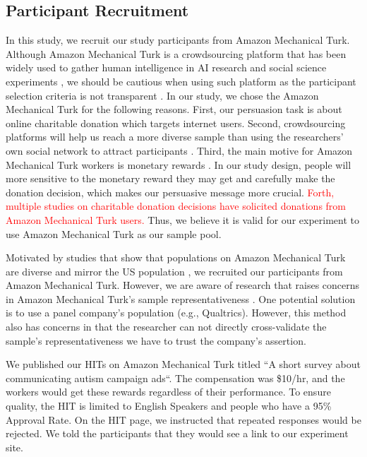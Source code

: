 \subsection{Participant Recruitment}
\label{sub:Participant Recruitment}
In this study, we recruit our study participants from Amazon Mechanical Turk. Although Amazon Mechanical Turk is a crowdsourcing platform that has been widely used to gather human intelligence in AI research and social science experiments \cite{ paolacci2014inside,berinsky2012evaluating,buhrmester2011amazon,branas2018gender,lee2013does,saunders2016no,arechar2017turking,sussman2015framing}, we should be cautious when using such platform as the participant selection criteria is not transparent \cite{landers2015inconvenient,paolacci2010running}. In our study, we chose the Amazon Mechanical Turk for the following reasons. First, our persuasion task is about online charitable donation which targets internet users. Second, crowdsourcing platforms will help us reach a more diverse sample than using the researchers' own social network to attract participants \cite{buhrmester2011amazon}. Third, the main motive for Amazon Mechanical Turk workers is monetary rewards \cite{berinsky2012evaluating}. In our study design, people will more sensitive to the monetary reward they may get and carefully make the donation decision, which makes our persuasive message more crucial. \textcolor{red}{Forth, multiple studies on charitable donation decisions have solicited donations from Amazon Mechanical Turk users\cite{branas2018gender,lee2013does,saunders2016no,arechar2017turking,sussman2015framing}.} Thus, we believe it is valid for our experiment to use Amazon Mechanical Turk as our sample pool. 

Motivated by studies that show that populations on Amazon Mechanical Turk are diverse and mirror the US population \cite{buhrmester2011amazon,behrend2011viability,berinsky2012evaluating}, we recruited our participants from Amazon Mechanical Turk. However, we are aware of research that raises concerns in Amazon Mechanical Turk's sample representativeness \cite{landers2015inconvenient,paolacci2010running}. One potential solution is to use a panel company's population (e.g., Qualtrics). However, this method also has concerns in that the researcher can not directly cross-validate the sample's representativeness we have to trust the company's assertion. 

We published our HITs on Amazon Mechanical Turk titled ``A short survey about communicating autism campaign ads``. The compensation was \$10/hr, and the workers would get these rewards regardless of their performance. To ensure quality, the HIT is limited to English Speakers and people who have a 95\% Approval Rate. On the HIT page, we instructed that repeated responses would be rejected. We told the participants that they would see a link to our experiment site. 

